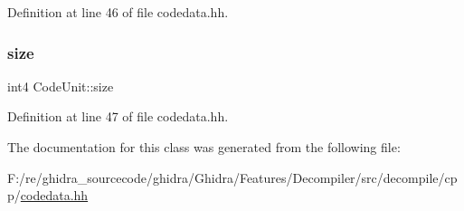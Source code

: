 Definition at line 46 of file codedata.\+hh.

\mbox{\label{class_code_unit_a704d5416d2e93beb88a791e2ae6337a6}} 
\subsubsection{\texorpdfstring{size}{size}}
{\footnotesize\ttfamily int4 Code\+Unit\+::size}



Definition at line 47 of file codedata.\+hh.



The documentation for this class was generated from the following file\+:\begin{DoxyCompactItemize}
\item 
F\+:/re/ghidra\+\_\+sourcecode/ghidra/\+Ghidra/\+Features/\+Decompiler/src/decompile/cpp/\mbox{\hyperlink{codedata_8hh}{codedata.\+hh}}\end{DoxyCompactItemize}
